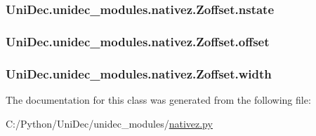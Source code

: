 \subsubsection[{nstate}]{\setlength{\rightskip}{0pt plus 5cm}Uni\+Dec.\+unidec\+\_\+modules.\+nativez.\+Zoffset.\+nstate}\label{class_uni_dec_1_1unidec__modules_1_1nativez_1_1_zoffset_a0c852917509c00a618e35d443efa9147}
\hypertarget{class_uni_dec_1_1unidec__modules_1_1nativez_1_1_zoffset_a9b1e6480531d69e340c5db96ed14fbf5}{}
\subsubsection[{offset}]{\setlength{\rightskip}{0pt plus 5cm}Uni\+Dec.\+unidec\+\_\+modules.\+nativez.\+Zoffset.\+offset}\label{class_uni_dec_1_1unidec__modules_1_1nativez_1_1_zoffset_a9b1e6480531d69e340c5db96ed14fbf5}
\hypertarget{class_uni_dec_1_1unidec__modules_1_1nativez_1_1_zoffset_ac7f6519ba9f4272be97e93877e9c8a41}{}
\subsubsection[{width}]{\setlength{\rightskip}{0pt plus 5cm}Uni\+Dec.\+unidec\+\_\+modules.\+nativez.\+Zoffset.\+width}\label{class_uni_dec_1_1unidec__modules_1_1nativez_1_1_zoffset_ac7f6519ba9f4272be97e93877e9c8a41}


The documentation for this class was generated from the following file\+:\begin{DoxyCompactItemize}
\item 
C\+:/\+Python/\+Uni\+Dec/unidec\+\_\+modules/\hyperlink{nativez_8py}{nativez.\+py}\end{DoxyCompactItemize}
